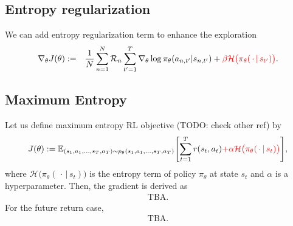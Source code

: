 \documentclass{article}
\begin{document}
\subsection{Entropy regularization}
We can add entropy regularization term to enhance the exploration~\citep{Mnih2016-eh}
\begin{eqnarray}
\nabla_\theta J(\theta)
&:=& \frac{1}{N} \sum_{n=1}^{N} \mathcal{R}_n \sum_{t^\prime=1}^{T} \nabla_\theta \log \pi_\theta (a_{n, t^\prime}|s_{n, t^\prime}) +
{\color{red}{\beta \mathcal{H} \bigl(\pi_\theta(\, \cdot \,|\, s_{t^\prime}) \bigr)}}.
\end{eqnarray}

\subsection{Maximum Entropy}
Let us define maximum entropy RL objective \citep{Haarnoja2017-xl} (TODO: check other ref) by
\begin{eqnarray}
J(\theta) := \mathbb{E}_{(s_1, a_1, \ldots, s_T, a_T) \sim p_\theta(s_1, a_1, \ldots, s_T, a_T)} \Biggl[ \sum_{t=1}^{T} r(s_t, a_t) {\color{red}{ + \alpha \mathcal{H} \bigl(\pi_\theta(\, \cdot \,|\, s_t) \bigr) }}\Biggr],
\end{eqnarray}
where $\mathcal{H} \bigl(\pi_\theta(\, \cdot \,|\, s_t) \bigr)$ is the entropy term of policy $\pi_\theta$ at state $s_t$ and $\alpha$ is a hyperparameter.
Then, the gradient is derived as
\begin{eqnarray}
\textrm{TBA.}
\end{eqnarray}
For the future return case,
\begin{eqnarray}
\textrm{TBA.}
\end{eqnarray}



\end{document}
